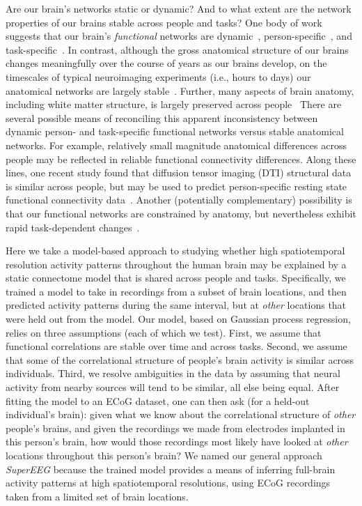 Are our brain's networks static or dynamic?  And to what extent are the network properties of our brains stable across people and tasks?  One body of work suggests that our brain's \textit{functional} networks are dynamic~\citep[e.g., ][]{MannEtal18}, person-specific~\citep[e.g., ][]{FinnEtal15}, and task-specific~\citep[e.g., ][]{Turk13}.  In contrast, although the gross anatomical structure of our brains changes meaningfully over the course of years as our brains develop, on the timescales of typical neuroimaging experiments (i.e., hours to days) our anatomical networks are largely stable~\citep[e.g., ][]{CaseEtal00}.  Further, many aspects of brain anatomy, including white matter structure, is largely preserved across people~\citep[e.g., ][]{TalaTour88, JahaEtal13, MoriEtal08}  There are several possible means of reconciling this apparent inconsistency between dynamic person- and task-specific functional networks versus stable anatomical networks.  For example, relatively small magnitude anatomical differences across people may be reflected in reliable functional connectivity differences.  Along these lines, one recent study found that diffusion tensor imaging (DTI) structural data is similar across people, but may be used to predict person-specific resting state functional connectivity data~\citep{BeckEtal18}.  Another (potentially complementary) possibility is that our functional networks are constrained by anatomy, but nevertheless exhibit rapid task-dependent changes~\citep[e.g., ][]{SporBetz16}.

Here we take a model-based approach to studying whether high
spatiotemporal resolution activity patterns throughout the human brain
may be explained by a static connectome model that is shared across
people and tasks.  Specifically, we trained a model to take in
recordings from a subset of brain locations, and then predicted
activity patterns during the same interval, but at \textit{other}
locations that were held out from the model.  Our model, based on
Gaussian process regression, relies on three assumptions (each of
which we test).  First, we assume that functional correlations are
stable over time and across tasks.  Second, we assume that some of the
correlational structure of people's brain activity is similar across
individuals.  Third, we resolve ambiguities in the data by assuming
that neural activity from nearby sources will tend to be similar, all
else being equal.  After fitting the model to an ECoG dataset, one can
then ask (for a held-out individual's brain): given what we know about
the correlational structure of \textit{other} people's brains, and
given the recordings we made from electrodes implanted in this
person's brain, how would those recordings most likely have looked at
\textit{other} locations throughout this person's brain?  We named our
general approach \textit{SuperEEG} because the trained model provides
a means of inferring full-brain activity patterns at high
spatiotemporal resolutions, using ECoG recordings taken from a limited
set of brain locations.

